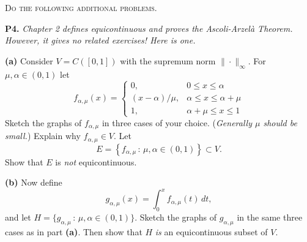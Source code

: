 \documentclass[12pt]{amsart}
\newcommand{\prob}[1]{\bigskip\noindent\textbf{#1.}\quad }
\newcommand{\epart}[1]{\medskip\noindent\textbf{(#1)}\quad }
\begin{document}
\medskip
\noindent \textsc{Do the following additional problems.}

\prob{P4}  \emph{Chapter 2 defines \emph{equicontinuous} and proves the Ascoli-Arzel\`a Theorem.  However, it gives no related exercises!  Here is one.}

\epart{a}  Consider $V=C([0,1])$ with the supremum norm $\|\cdot\|_\infty$.  For $\mu,\alpha \in (0,1)$ let
	$$f_{\alpha,\mu}(x) = \begin{cases} 0, & 0 \le x \le \alpha \\
	                                    (x-\alpha)/\mu, & \alpha \le x \le \alpha + \mu \\
	                                    1, & \alpha + \mu \le x \le 1 \end{cases}$$
Sketch the graphs of $f_{\alpha,\mu}$ in three cases of your choice.  (\emph{Generally $\mu$ should be small.})  Explain why $f_{\alpha,\mu}\in V$.  Let
	$$E = \left\{f_{\alpha,\mu}\,:\,\mu,\alpha \in (0,1)\right\} \subset V.$$
Show that $E$ is \emph{not} equicontinuous.

\epart{b}  Now define
	$$g_{\alpha,\mu}(x) = \int_0^x f_{\alpha,\mu}(t)\,dt,$$
and let $H = \{g_{\alpha,\mu}\,:\,\mu,\alpha \in (0,1)\}$.  Sketch the graphs of $g_{\alpha,\mu}$ in the same three cases as in part \textbf{(a)}.  Then show that $H$ \emph{is} an equicontinuous subset of $V$.
\end{document}
